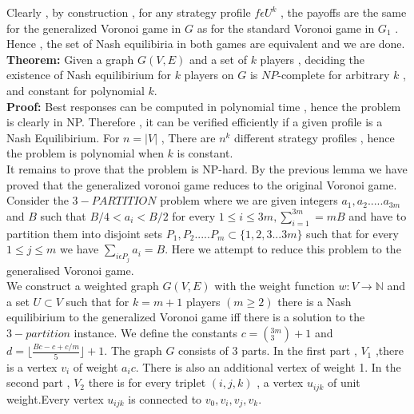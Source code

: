 \documentclass[12pt]{article}
\begin{document}
Clearly , by construction , for any strategy profile $f \epsilon U^{k}$ , the payoffs are the same for the generalized Voronoi game in $G$ as for the standard Voronoi game in $G_{1}$ . Hence , the set of Nash equilibiria in both games are equivalent and we are done.\\
  
{\bf Theorem:} Given a graph $G(V,E)$ and a set of $k$ players , deciding the existence of Nash equilibirium for $k$ players on $G$ is $NP$-complete for arbitrary $k$ , and constant for polynomial $k$.\\

{\bf Proof:} Best responses can be computed in polynomial time , hence the problem is clearly in NP. Therefore , it can be verified efficiently if a given profile is a Nash Equilibirium. For $n = |V|$ , There are $n^{k}$ different strategy profiles , hence the problem is polynomial when $k$ is constant.\\

It remains to prove that the problem is NP-hard. By the previous lemma we have proved that the generalized voronoi game reduces to the original Voronoi game.\\

Consider the $3-PARTITION$ problem where we are given integers $a_{1},a_{2}.....a_{3m}$ and $B$ such that $B/4 < a_{i} < B/2$ for every $1 \leq i \leq 3m , \sum_{i=1}^{3m} = mB$ and have to partition them into disjoint sets $P_{1},P_{2}.....P_{m} \subset \lbrace1,2,3...3m \rbrace$ such that for every $1 \leq j \leq m$ we have $\sum_{i \epsilon P_{j}} a_{i} = B$. Here we attempt to reduce this problem to the generalised Voronoi game.\\

We construct a weighted graph $G(V,E)$ with the weight function $w:V \rightarrow \mathbb{N}$ and a set $U \subset V$ such that for $k=m+1$ players $(m \geq 2)$ there is a Nash equilibirium to the generalized Voronoi game iff there is a solution to the $3-partition$ instance.
We define the constants $c=\left( _{3}^{3m}\right) +1$ and $d= \lfloor \frac{Bc-c+c/m}{5} \rfloor +1$. The graph $G$ consists of 3 parts. In the first part , $V_{1}$ ,there is a vertex $v_{i}$ of weight $a_{i}c$. There is also an additional vertex of weight 1. In the second part , $V_{2}$ there is for every triplet $(i,j,k)$ , a vertex $u_{ijk}$ of unit weight.Every vertex $u_{ijk}$ is connected to $v_{0},v_{i},v_{j},v_{k}$.\\
\end{document}
